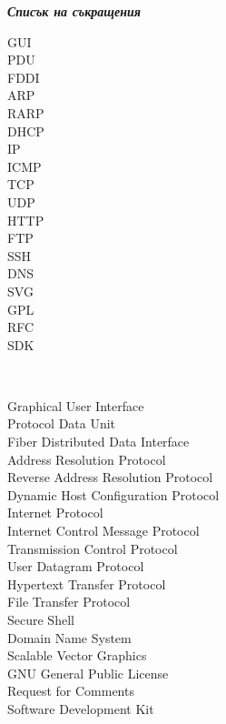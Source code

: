 \documentclass[12pt,a4paper,oneside]{book}
\begin{document}
\newpage
\begin{flushleft}
\begin{Large}
\emph{\bf Списък на съкращения}\\
\end{Large}
\end{flushleft}
\begin{spacing}{1.241}
\vspace{10mm}
\begin{minipage}{0.2\textwidth}
\begin{flushleft} \normalsize
GUI\\
PDU\\
FDDI\\
ARP\\
RARP\\
DHCP\\
IP\\
ICMP\\
TCP\\
UDP\\
HTTP\\
FTP\\
SSH\\
DNS\\
SVG\\
GPL\\
RFC\\
SDK\\
\end{flushleft}
\end{minipage}
~
\begin{minipage}{0.5\textwidth}
\begin{flushleft} \normalsize
Graphical User Interface\\
Protocol Data Unit\\
Fiber Distributed Data Interface\\
Address Resolution Protocol\\
Reverse Address Resolution Protocol\\
Dynamic Host Configuration Protocol\\
Internet Protocol\\
Internet Control Message Protocol\\
Transmission Control Protocol\\
User Datagram Protocol\\
Hypertext Transfer Protocol\\
File Transfer Protocol\\
Secure Shell\\
Domain Name System\\
Scalable Vector Graphics\\
GNU General Public License\\
Request for Comments\\
Software Development Kit\\
\end{flushleft}
\end{minipage}\\[4cm]
\end{spacing}
\vfill
\end{document}
